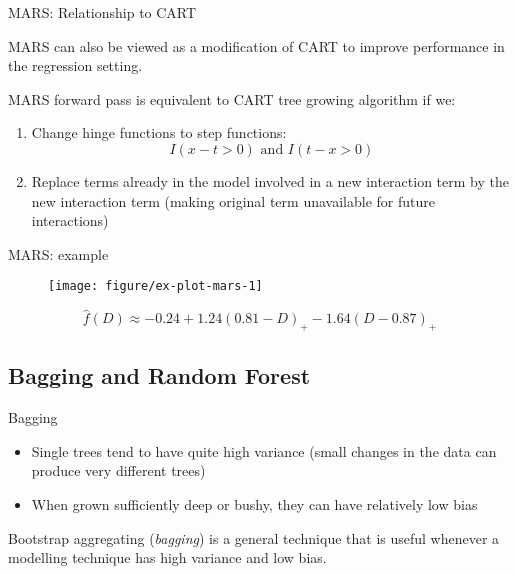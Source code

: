 \documentclass[handout]{beamer}
\begin{document}
\begin{frame}{MARS: Relationship to CART}
  
  MARS can also be viewed as a modification of CART to improve performance in the regression setting.
  
  MARS forward pass is equivalent to CART tree growing algorithm if we:
  \begin{enumerate}
    \item Change hinge functions to step functions:
    \begin{equation*}
      I(x - t > 0) \text{ and } I(t - x > 0)
    \end{equation*}
    \item Replace terms already in the model involved in a new interaction term by the new interaction term (making original term unavailable for future interactions)
  \end{enumerate}
\end{frame}


\begin{frame}[t]{MARS: example}

\begin{figure}[!htbp]
\begin{center}
  \texttt{[image: figure/ex-plot-mars-1]}
\end{center}
\end{figure}
%
\begin{equation*}
  \label{eq:mars-eqn}
  \hat{f}(D) \approx -0.24 + 1.24 (0.81 - D)_{+} -1.64 (D - 0.87)_{+}
\end{equation*}

\end{frame}


\subsection{Bagging and Random Forest} %
\label{sub:bagging_and_random}

\begin{frame}{Bagging}
  
  \begin{itemize}
    \item Single trees tend to have quite high variance (small changes in the data can produce very different trees)
    \item When grown sufficiently deep or bushy, they can have relatively low bias 
  \end{itemize}
  
  Bootstrap aggregating (\emph{bagging}) is a general technique that is useful whenever a modelling technique has high variance and low bias.
  
\end{frame}
\end{document}
